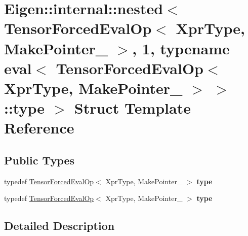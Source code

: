 \hypertarget{struct_eigen_1_1internal_1_1nested_3_01_tensor_forced_eval_op_3_01_xpr_type_00_01_make_pointer__9f18abfe403ccefd01462ad1cf126848}{}\section{Eigen\+:\+:internal\+:\+:nested$<$ Tensor\+Forced\+Eval\+Op$<$ Xpr\+Type, Make\+Pointer\+\_\+ $>$, 1, typename eval$<$ Tensor\+Forced\+Eval\+Op$<$ Xpr\+Type, Make\+Pointer\+\_\+ $>$ $>$\+:\+:type $>$ Struct Template Reference}
\label{struct_eigen_1_1internal_1_1nested_3_01_tensor_forced_eval_op_3_01_xpr_type_00_01_make_pointer__9f18abfe403ccefd01462ad1cf126848}
\subsection*{Public Types}
\begin{DoxyCompactItemize}
\item 
\mbox{\label{struct_eigen_1_1internal_1_1nested_3_01_tensor_forced_eval_op_3_01_xpr_type_00_01_make_pointer__9f18abfe403ccefd01462ad1cf126848_aa2747634d964e50f5b2fb983b2add447}} 
typedef \hyperlink{class_eigen_1_1_tensor_forced_eval_op}{Tensor\+Forced\+Eval\+Op}$<$ Xpr\+Type, Make\+Pointer\+\_\+ $>$ {\bfseries type}
\item 
\mbox{\label{struct_eigen_1_1internal_1_1nested_3_01_tensor_forced_eval_op_3_01_xpr_type_00_01_make_pointer__9f18abfe403ccefd01462ad1cf126848_aa2747634d964e50f5b2fb983b2add447}} 
typedef \hyperlink{class_eigen_1_1_tensor_forced_eval_op}{Tensor\+Forced\+Eval\+Op}$<$ Xpr\+Type, Make\+Pointer\+\_\+ $>$ {\bfseries type}
\end{DoxyCompactItemize}


\subsection{Detailed Description}
